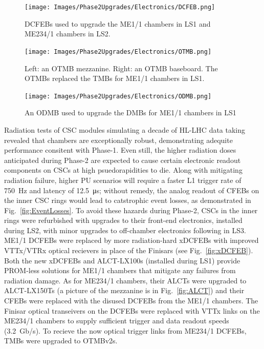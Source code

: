 \begin{figure}[H]
    \centering
    {\texttt{[image: Images/Phase2Upgrades/Electronics/DCFEB.png]}}
    \caption{DCFEBs used to upgrade the ME1/1 chambers in LS1 and ME234/1 chambers in LS2.}
    \label{fig:DCFEB}
\end{figure}

\begin{figure}[H]
    \centering
    {\texttt{[image: Images/Phase2Upgrades/Electronics/OTMB.png]}}
    \caption{Left: an OTMB mezzanine. Right: an OTMB baseboard. The OTMBs replaced the TMBs for ME1/1 chambers in LS1.}
    \label{fig:OTMB}
\end{figure}

\begin{figure}[H]
    \centering
    {\texttt{[image: Images/Phase2Upgrades/Electronics/ODMB.png]}}
    \caption{An ODMB used to upgrade the DMBs for ME1/1 chambers in LS1}
    \label{fig:ODMB}
\end{figure}

Radiation tests of CSC modules simulating a decade of HL-LHC data taking revealed that chambers are exceptionally robust, demonstrating adequite performance consitent with Phase-1. Even still, the higher radiation doses anticipated during Phase-2 are expected to cause certain electronic readout components on CSCs at high psuedorapidities to die. Along with mitigating radiation failure, higher PU scenarios will require a faster L1 trigger rate of \SI{750}{Hz} and latency of \SI{12.5}{\micro s}; without remedy, the analog readout of CFEBs on the inner CSC rings would lead to catstrophic event losses, as demonstrated in Fig.~\ref{fig:EventLosses}. To avoid these hazards during Phase-2, CSCs in the inner rings were refurbished with upgrades to their front-end electronics, installed during LS2, with minor upgrades to off-chamber electronics following in LS3. ME1/1 DCFEBs were replaced by more radiation-hard xDCFEBs with improved VTTx/VTRx optical recievers in place of the Finisars (see Fig.~\ref{fig:xDCFEB}). Both the new xDCFEBs and ALCT-LX100s (installed during LS1) provide PROM-less solutions for ME1/1 chambers that mitigate any failures from radiation damage. As for ME234/1 chambers, their ALCTs were upgraded to ALCT-LX150Ts (a picture of the mezzanine is in Fig.~\ref{fig:ALCT}) and their CFEBs were replaced with the disused DCFEBs from the ME1/1 chambers. The Finisar optical transeivers on the DCFEBs were replaced with VTTx links on the ME234/1 chambers to supply sufficient trigger and data readout speeds (\SI{3.2}{Gb/s}). To recieve the now optical trigger links from ME234/1 DCFEBs, TMBs were upgraded to OTMBv2s. 

